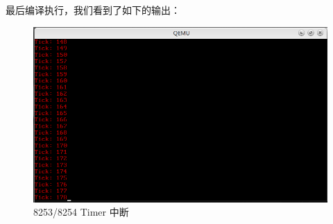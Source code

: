 \par 最后编译执行，我们看到了如下的输出：
\begin{figure}[ht]
      \centering
      \includegraphics[scale=0.6]{picture/chapt8/8253_TIMER.png}
      \caption{8253/8254 Timer 中断}
\end{figure}

